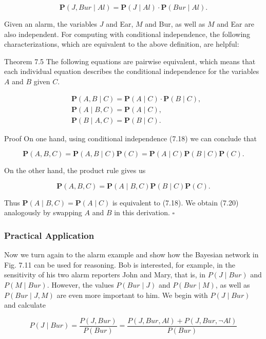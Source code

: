 \documentclass[10pt]{book}
\begin{document}
$$
\boldsymbol{P}(J, B u r \mid A l)=\boldsymbol{P}(J \mid A l) \cdot \boldsymbol{P}(B u r \mid A l) .
$$

Given an alarm, the variables $J$ and Ear, $M$ and Bur, as well as $M$ and Ear are also independent. For computing with conditional independence, the following characterizations, which are equivalent to the above definition, are helpful:

Theorem 7.5 The following equations are pairwise equivalent, which means that each individual equation describes the conditional independence for the variables $A$ and $B$ given $C$.


\begin{align*}
& \boldsymbol{P}(A, B \mid C)=\boldsymbol{P}(A \mid C) \cdot \boldsymbol{P}(B \mid C),  \tag{7.18}\\
& \boldsymbol{P}(A \mid B, C)=\boldsymbol{P}(A \mid C),  \tag{7.19}\\
& \boldsymbol{P}(B \mid A, C)=\boldsymbol{P}(B \mid C) . \tag{7.20}
\end{align*}


Proof On one hand, using conditional independence (7.18) we can conclude that

$$
\boldsymbol{P}(A, B, C)=\boldsymbol{P}(A, B \mid C) \boldsymbol{P}(C)=\boldsymbol{P}(A \mid C) \boldsymbol{P}(B \mid C) \boldsymbol{P}(C) .
$$

On the other hand, the product rule gives us

$$
\boldsymbol{P}(A, B, C)=\boldsymbol{P}(A \mid B, C) \boldsymbol{P}(B \mid C) \boldsymbol{P}(C) .
$$

Thus $\boldsymbol{P}(A \mid B, C)=\boldsymbol{P}(A \mid C)$ is equivalent to (7.18). We obtain (7.20) analogously by swapping $A$ and $B$ in this derivation. \(\square\)

\subsubsection*{Practical Application}
Now we turn again to the alarm example and show how the Bayesian network in Fig. 7.11 can be used for reasoning. Bob is interested, for example, in the sensitivity of his two alarm reporters John and Mary, that is, in $P(J \mid B u r)$ and $P(M \mid B u r)$. However, the values $P(B u r \mid J)$ and $P(B u r \mid M)$, as well as $P(B u r \mid J, M)$ are even more important to him. We begin with $P(J \mid B u r)$ and calculate


\begin{equation*}
P(J \mid B u r)=\frac{P(J, B u r)}{P(B u r)}=\frac{P(J, B u r, A l)+P(J, B u r, \neg A l)}{P(B u r)} \tag{7.21}
\end{equation*}
\end{document}
